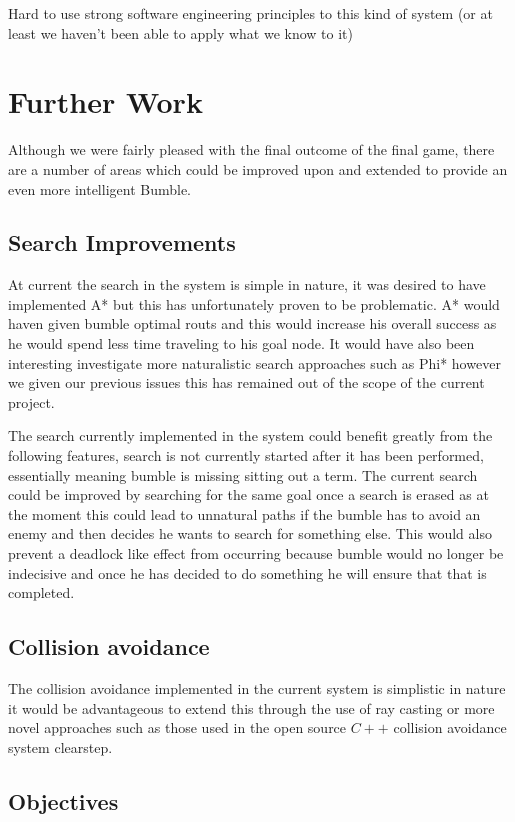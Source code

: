 \documentclass[a4paper,oneside]{report}
\begin{document}
Hard to use strong software engineering principles to this kind of system (or at least we haven't been able to apply what we know to it)

\section{Further Work}

Although we were fairly pleased with the final outcome of the final game, there are a number of areas which could be improved upon and extended to provide an even more intelligent Bumble.
	
\subsection{Search Improvements}

At current the search in the system is simple in nature, it was desired to have implemented A* but this has unfortunately proven to be problematic.  A* would haven given bumble optimal routs and this would increase his overall success as he would spend less time traveling to his goal node. It would have also been interesting investigate more naturalistic search approaches such as Phi* however we given our previous issues this has remained out of the scope of the current project. 
		
The search currently implemented in the system could benefit greatly from the following features, search is not currently started after it has been performed, essentially meaning bumble is missing sitting out a term. The current search could be improved by searching for the same goal once a search is erased as at the moment this could lead to unnatural paths if the bumble has to avoid an enemy and then decides he wants to search for something else. This would also prevent a deadlock like effect from occurring because bumble would no longer be indecisive and once he has decided to do something he will ensure that that is completed. 
				
\subsection{Collision avoidance}
		The collision avoidance implemented in the current system is simplistic in nature it would be advantageous to extend this through the use of ray casting or more novel approaches such as those used in the open source $C++$ collision avoidance system clearstep. 
						
\subsection{Objectives}
\end{document}
